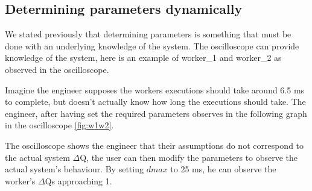     \subsection{Determining parameters dynamically}
        We stated previously that determining parameters is something that must be done with an underlying knowledge of the system. The oscilloscope can provide knowledge of the system, here is an example of worker\_1 and worker\_2 as observed in the oscilloscope.

        Imagine the engineer supposes the workers executions should take around 6.5 ms to complete, but doesn't actually know how long the executions should take. The engineer, after having set the required parameters observes in the following graph in the oscilloscope \ref{fig:w1w2}.

    The oscilloscope shows the engineer that their assumptions do not correspond to the actual system $\Delta$Q, the user can then modify the parameters to observe the actual system's behaviour. By setting $dmax$ to 25 ms, he can observe the worker's $\Delta$Qs approaching 1.


